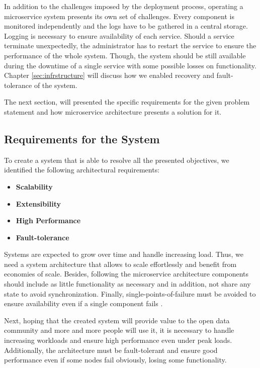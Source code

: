 In addition to the challenges imposed by the deployment process,
operating a microservice system presents its own set of challenges.
Every component is monitored independently and the logs have to be
gathered in a central storage. Logging is necessary to ensure
availability of each service. Should a service terminate unexpectedly,
the administrator has to restart the service to ensure the performance
of the whole system. Though, the system should be still available during
the downtime of a single service with some possible losses on
functionality. Chapter \ref{sec:infrstructure} will discuss how
we enabled recovery and fault-tolerance of the system.

The next section, will presented the specific requirements for the given
problem statement and how microservice architecture presents a solution
for it.

\subsection{Requirements for the System}\label{requirements-of-the-whole-platform}

To create a system that is able to resolve all the presented objectives,
we identified the following architectural requirements:

\begin{itemize}
\tightlist
\item
  \textbf{Scalability}
\item
  \textbf{Extensibility}
\item
  \textbf{High Performance}
\item
  \textbf{Fault-tolerance}
\end{itemize}

Systems are expected to grow over time and handle increasing load. Thus,
we need a system architecture that allows to scale effortlessly and
benefit from economies of scale. Besides, following the microservice
architecture components should include as little functionality as
necessary and in addition, not share any state to avoid synchronization.
Finally, single-points-of-failure must be avoided to ensure availability
even if a single component fails \cite{Chatzakis.2016}.

Next, hoping that the created system will provide value to the open data
community and more and more people will use it, it is necessary to
handle increasing workloads and ensure high performance even under peak
loads. Additionally, the architecture must be fault-tolerant and ensure
good performance even if some nodes fail obviously, losing some
functionality.

